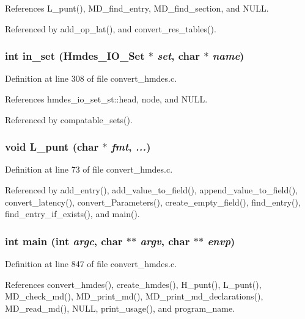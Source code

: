 References L\_\-punt(), MD\_\-find\_\-entry, MD\_\-find\_\-section, and NULL.

Referenced by add\_\-op\_\-lat(), and convert\_\-res\_\-tables().
\subsubsection{\setlength{\rightskip}{0pt plus 5cm}int in\_\-set (\bf{Hmdes\_\-IO\_\-Set} $\ast$ {\em set}, char $\ast$ {\em name})}\label{convert__hmdes_8c_b72910e402756bb494e73ff644d6a468}




Definition at line 308 of file convert\_\-hmdes.c.

References hmdes\_\-io\_\-set\_\-st::head, node, and NULL.

Referenced by compatable\_\-sets().
\subsubsection{\setlength{\rightskip}{0pt plus 5cm}void L\_\-punt (char $\ast$ {\em fmt},  {\em ...})}\label{convert__hmdes_8c_c8ccfa451c1bd1740a1b720ba5b4c3a9}




Definition at line 73 of file convert\_\-hmdes.c.

Referenced by add\_\-entry(), add\_\-value\_\-to\_\-field(), append\_\-value\_\-to\_\-field(), convert\_\-latency(), convert\_\-Parameters(), create\_\-empty\_\-field(), find\_\-entry(), find\_\-entry\_\-if\_\-exists(), and main().
\subsubsection{\setlength{\rightskip}{0pt plus 5cm}int main (int {\em argc}, char $\ast$$\ast$ {\em argv}, char $\ast$$\ast$ {\em envp})}\label{convert__hmdes_8c_647f21a28344e1d9c643f4115516d7c9}




Definition at line 847 of file convert\_\-hmdes.c.

References convert\_\-hmdes(), create\_\-hmdes(), H\_\-punt(), L\_\-punt(), MD\_\-check\_\-md(), MD\_\-print\_\-md(), MD\_\-print\_\-md\_\-declarations(), MD\_\-read\_\-md(), NULL, print\_\-usage(), and program\_\-name.
